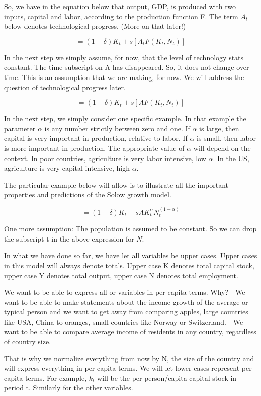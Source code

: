 \documentclass[
]{book}
\begin{document}
So, we have in the equation below that output, GDP, is produced with two inputs, capital and labor, according to the production function F. The term \(A_t\) below denotes technological progress. (More on that later!)

\[=(1-δ) K_t+s[A_t F (K_t,N_t)]\]

In the next step we simply assume, for now, that the level of technology stats constant. The time subscript on A has disappeared. So, it does not change over time. This is an assumption that we are making, for now. We will address the question of technological progress later.

\[=(1-δ) K_t+s[A F (K_t,N_t)]\]

In the next step, we simply consider one specific example. In that example the parameter \(\alpha\) is any number strictly between zero and one. If \(\alpha\) is large, then capital is very important in production, relative to labor. If \(\alpha\) is small, then labor is more important in production. The appropriate value of \(\alpha\) will depend on the context. In poor countries, agriculture is very labor intensive, low \(\alpha\). In the US, agriculture is very capital intensive, high \(\alpha\).

The particular example below will allow is to illustrate all the important properties and predictions of the Solow growth model.

\[=(1-δ) K_t+s A K_t^\alpha N_t^{(1-\alpha)}\]

One more assumption: The population is assumed to be constant. So we can drop the subscript t in the above expression for \(N\).

In what we have done so far, we have let all variables be upper cases. Upper cases in this model will always denote totals. Upper case K denotes total capital stock, upper case Y denotes total output, upper case N denotes total employment.

We want to be able to express all or variables in per capita terms. Why?
- We want to be able to make statements about the income growth of the average or typical person and we want to get away from comparing apples, large countries like USA, China to oranges, small countries like Norway or Switzerland.
- We want to be able to compare average income of residents in any country, regardless of country size.

That is why we normalize everything from now by N, the size of the country and will express everything in per capita terms. We will let lower cases represent per capita terms. For example, \(k_t\) will be the per person/capita capital stock in period t. Similarly for the other variables.
\end{document}
